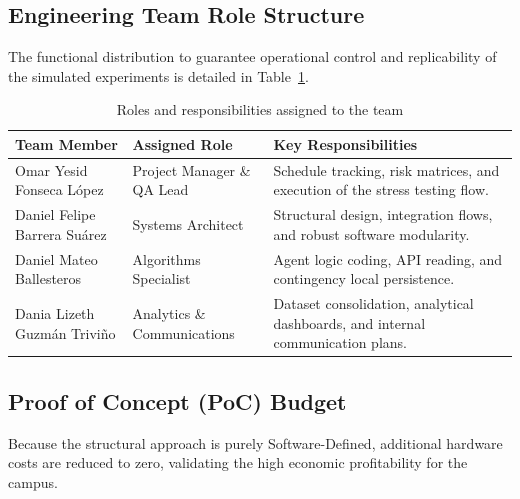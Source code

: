 \documentclass[12pt,a4paper]{article}
\begin{document}
\subsection{Engineering Team Role Structure}
The functional distribution to guarantee operational control and replicability of the simulated experiments is detailed in Table~\ref{tab:roles}.

\begin{table}[H]
\caption{Roles and responsibilities assigned to the team}
\label{tab:roles}
\centering
\begin{tabular}{|>{\raggedright\arraybackslash}p{3cm}|>{\raggedright\arraybackslash}p{4.8cm}|>{\raggedright\arraybackslash}p{6cm}|}
\hline
\textbf{Team Member} & \textbf{Assigned Role} & \textbf{Key Responsibilities} \\
\hline
Omar Yesid Fonseca López & Project Manager \& QA Lead & Schedule tracking, risk matrices, and execution of the stress testing flow. \\
\hline
Daniel Felipe Barrera Suárez & Systems Architect & Structural design, integration flows, and robust software modularity. \\
\hline
Daniel Mateo Ballesteros & Algorithms Specialist & Agent logic coding, API reading, and contingency local persistence. \\
\hline
Dania Lizeth Guzmán Triviño & Analytics \& Communications & Dataset consolidation, analytical dashboards, and internal communication plans. \\
\hline
\end{tabular}
\end{table}

\subsection{Proof of Concept (PoC) Budget}
Because the structural approach is purely Software-Defined, additional hardware costs are reduced to zero, validating the high economic profitability for the campus.
\end{document}
